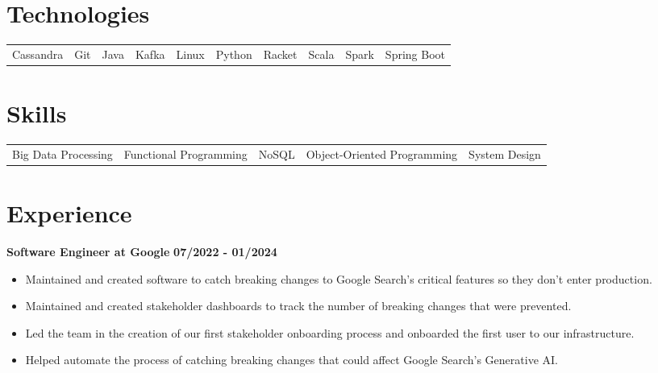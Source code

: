 \documentclass{res}
\begin{document}
\address{www.anthonyhicksiii.com}
\address{ahicks3rd@gmail.com}

\setlength\itemsep{0em}

\begin{resume}
\section{\large{Technologies}}
\begin{tabular}{	l	l	l 	l	l	l	l	l	l	l 	}
	Cassandra  & Git  & Java & Kafka & Linux & Python & Racket & Scala & Spark & Spring Boot
\end{tabular}

\section{\large{Skills}}
\begin{tabular}{	l 	l 	l 	l	l 	}
	Big Data Processing & Functional Programming & NoSQL & Object-Oriented Programming & System Design
\end{tabular}

\section{\large{Experience}}
	\textbf{Software Engineer at Google}
	\hfill{\bf 07/2022 - 01/2024}
	\begin{itemize}
		\item Maintained and created software to catch breaking changes to Google Search's critical features so they don't enter production.
		\item Maintained and created stakeholder dashboards to track the number of breaking changes that were prevented.
		\item Led the team in the creation of our first stakeholder onboarding process and onboarded the first user to our infrastructure.
		\item Helped automate the process of catching breaking changes that could affect Google Search's Generative AI.
	\end{itemize}
	

\end{resume}
\end{document}
